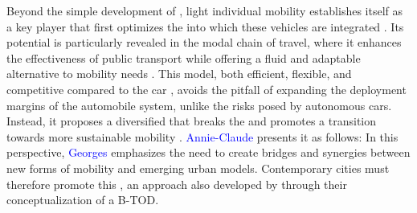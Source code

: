 \begin{refsegment}
Beyond the simple development of , light individual mobility establishes itself as a key player that first optimizes the  into which these vehicles are integrated \textcolor{blue}{\autocite[76]{krakovitch_metropolitrain_2019}}. Its potential is particularly revealed in the modal chain of travel, where it enhances the effectiveness of public transport while offering a fluid and adaptable alternative to mobility needs \textcolor{blue}{\autocite[4]{molino_pratiques_2015}}. This  model, both efficient, flexible, and competitive compared to the car \textcolor{blue}{\autocite[107]{wang_bicycle-transit_2013}}, avoids the pitfall of expanding the deployment margins of the automobile system, unlike the risks posed by autonomous cars. Instead, it proposes a diversified  that breaks the  and promotes a transition towards more sustainable mobility \textcolor{blue}{\autocites[81]{bertolini_planning_2017}[42]{6t-bureau_de_recherche_livre_2019}}. \textcolor{blue}{Annie-Claude} \textcolor{blue}{\textcite[35]{sebban_complementarite_2003}} presents it as follows:  In this perspective, \textcolor{blue}{Georges} \textcolor{blue}{\textcite[225]{amar_homo_2016}} emphasizes the need to create bridges and synergies between new forms of mobility and emerging urban models. Contemporary cities must therefore promote this , an approach also developed by \textcolor{blue}{\textcite[979]{lee_bicycle-based_2016}} through their conceptualization of a \acrfull{B-TOD}.%


\end{refsegment}
